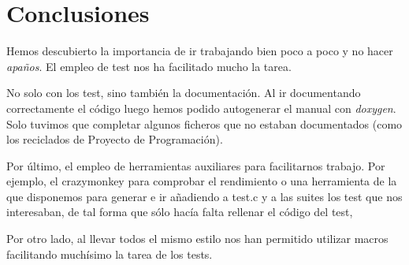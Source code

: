 \documentclass[nochap]{apuntes}
\begin{document}
\section{Conclusiones}

Hemos descubierto la importancia de ir trabajando bien poco a poco y no hacer \textit{apaños}. El empleo de test nos ha facilitado mucho la tarea. 

No solo con los test, sino también la documentación. Al ir documentando correctamente el código luego hemos podido autogenerar el manual con \textit{doxygen}. Solo tuvimos que completar algunos ficheros que no estaban documentados (como los reciclados de Proyecto de Programación).

Por último, el empleo de herramientas auxiliares para facilitarnos trabajo. Por ejemplo, el crazymonkey para comprobar el rendimiento o una herramienta de la que disponemos para generar e ir añadiendo a test.c y a las suites los test que nos interesaban, de tal forma que sólo hacía falta rellenar el código del test, 

Por otro lado, al llevar todos el mismo estilo nos han permitido utilizar macros facilitando muchísimo la tarea de los tests.
\end{document}
